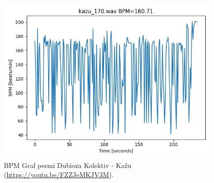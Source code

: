 \documentclass[a4paper,11pt]{article}
\begin{document}
\begin{figure}[htpb]
\begin{center}
\includegraphics[scale=0.6]{images/kazu_bpm.png}
\caption{BPM Graf pesmi Dubioza Kolektiv - Kažu (\url{https://youtu.be/FZZJeMKJV3M}).}
\label{bpm_kazu}
\end{center}
\end{figure}



{}
\end{document}
